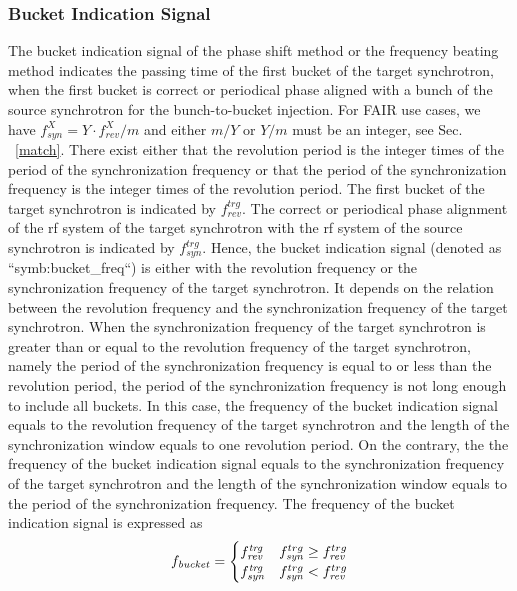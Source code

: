 \subsubsection{Bucket Indication Signal}
The bucket indication signal of the phase shift method or the frequency beating method indicates the passing time of the first bucket of the target synchrotron, when the first bucket is correct or periodical phase aligned with a bunch of the source synchrotron for the bunch-to-bucket injection. For FAIR use cases, we have $f_\mathit{syn}^{X}=Y\cdot f_\mathit{rev}^{X}/m$ and either $m/Y$ or $Y/m$ must be an integer, see Sec. ~\ref{match}. There exist either that the revolution period is the integer times of the period of the synchronization frequency or that the period of the synchronization frequency is the integer times of the revolution period. The first bucket of the target synchrotron is indicated by $f_{\mathit{rev}}^{trg}$. The correct or periodical phase alignment of the rf system of the target synchrotron with the rf system of the source synchrotron is indicated by $f_{\mathit{syn}}^{trg}$. Hence, the bucket indication signal (denoted as ``\gls{symb:bucket_freq}``) is either with the revolution frequency or the synchronization frequency of the target synchrotron. It depends on the relation between the revolution frequency and the synchronization frequency of the target synchrotron. When the synchronization frequency of the target synchrotron is greater than or equal to the revolution frequency of the target synchrotron, namely the period of the synchronization frequency is equal to or less than the revolution period, the period of the synchronization frequency is not long enough to include all buckets. In this case, the frequency of the bucket indication signal equals to the revolution frequency of the target synchrotron and the length of the synchronization window equals to one revolution period. On the contrary, the the frequency of the bucket indication signal equals to the synchronization frequency of the target synchrotron and the length of the synchronization window equals to the period of the synchronization frequency. The frequency of the bucket indication signal is expressed as
\begin{eqnarray}
\label{bucket_ind}
f_\mathit{bucket}=
\begin{cases}
f_\mathit{rev}^\mathit{trg} &f_{\mathit{syn}}^{trg}\ge f_{\mathit{rev}}^{trg}\cr

f_\mathit{syn}^\mathit{trg}
&f_{\mathit{syn}}^{trg}<f_{\mathit{rev}}^{trg}
\end{cases}
\end{eqnarray}

